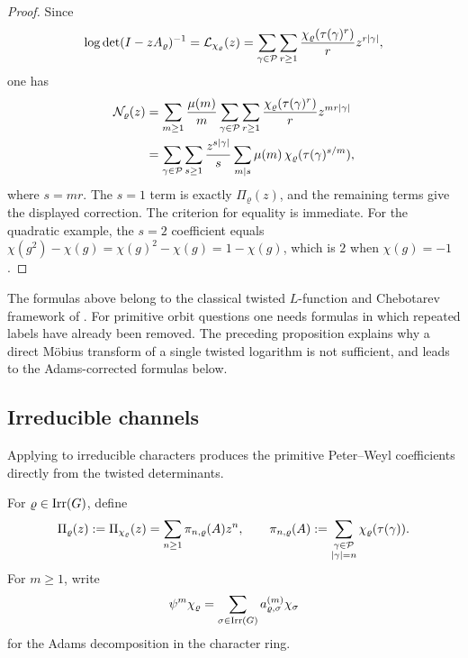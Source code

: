 \begin{proof}
  Since
  \[
    \log\det(I-zA_\varrho)^{-1}
    =\mathcal L_{\chi_\varrho}(z)
    =\sum_{\gamma\in\mathcal P}\sum_{r\ge 1}
      \frac{\chi_\varrho(\tau(\gamma)^r)}{r}z^{r|\gamma|},
  \]
  one has
  \begin{align*}
    \mathcal N_\varrho(z)
    &=
    \sum_{m\ge 1}\frac{\mu(m)}{m}
      \sum_{\gamma\in\mathcal P}\sum_{r\ge 1}
        \frac{\chi_\varrho(\tau(\gamma)^r)}{r}z^{mr|\gamma|} \\
    &=
    \sum_{\gamma\in\mathcal P}\sum_{s\ge 1}\frac{z^{s|\gamma|}}{s}
      \sum_{m\mid s}\mu(m)\,
        \chi_\varrho(\tau(\gamma)^{s/m}),
  \end{align*}
  where \(s=mr\). The \(s=1\) term is exactly \(\Pi_\varrho(z)\), and
  the remaining terms give the displayed correction. The criterion for
  equality is immediate. For the quadratic example, the \(s=2\)
  coefficient equals
  \(\chi(g^2)-\chi(g)=\chi(g)^2-\chi(g)=1-\chi(g)\), which is \(2\)
  when \(\chi(g)=-1\).
\end{proof}

The formulas above belong to the classical twisted
\(L\)-function and Chebotarev framework of
\cite{AdachiSunada1987TwistedPerronFrobenius,Sunada1989DynamicalLFunctions,ParryPollicott1986Chebotarev,KotaniSunada2000ZetaFiniteGraphs,StarkTerras1996ZetaGraphCoverings,StarkTerras2000ZetaGraphCoveringsII,TerrasStark2007ZetaGraphCoveringsIII}.
For primitive orbit questions one needs formulas in which repeated
labels have already been removed. The preceding proposition explains
why a direct M\"obius transform of a single twisted logarithm is not
sufficient, and leads to the Adams-corrected formulas below.

\subsection{Irreducible channels}

Applying  to irreducible
characters produces the primitive Peter--Weyl coefficients directly
from the twisted determinants.

For \(\varrho\in\operatorname{Irr}(G)\), define
\begin{equation}\label{eq:primitive-peter-weyl-series}
  \Pi_\varrho(z):=\Pi_{\chi_\varrho}(z)
  =\sum_{n\ge 1}\pi_{n,\varrho}(A)z^n,
  \qquad
  \pi_{n,\varrho}(A)
  :=\sum_{\substack{\gamma\in\mathcal P\\ |\gamma|=n}}
    \chi_\varrho(\tau(\gamma)).
\end{equation}
For \(m\ge 1\), write
\begin{equation}\label{eq:adams-character-decomposition}
  \psi^m\chi_\varrho
  =\sum_{\sigma\in\operatorname{Irr}(G)}a_{\varrho,\sigma}^{(m)}\chi_\sigma
\end{equation}
for the Adams decomposition in the character ring.

